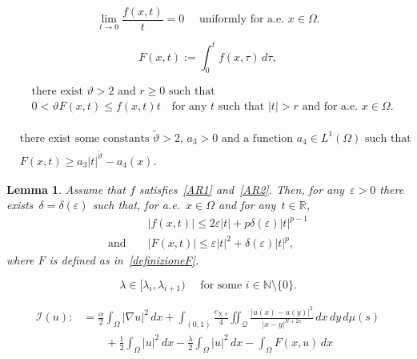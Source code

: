 \documentclass[10pt,a4paper]{amsart}
\newtheorem{lemma}{Lemma}
\def \N {\mathbb{N}}
\def \Q {\mathcal Q}
\def \R {\mathbb{R}}
\renewcommand{\geq}{\geqslant}
\renewcommand{\leq}{\leqslant}
\begin{document}
\begin{equation}\label{AR2}
\lim_{t\to 0}\frac{f(x,t)}{t}=0  \quad \mbox{ uniformly for a.e. } x\in \Omega.
\end{equation}

\begin{equation}\label{definizioneF}
F(x,t):=\int_0^t f(x,\tau)\,d\tau,
\end{equation}

\begin{equation}\label{AR3}
\begin{split}
&\mbox{there exist $\vartheta>2$ and $r\geq 0$ such that}\\
&0<\vartheta F(x,t)\leq f(x,t)t  \quad\mbox{for any } t \mbox{ such that } |t|> r \mbox{ and for a.e. } x\in \Omega.
\end{split}
\end{equation}

\begin{equation}\label{AR4}
\begin{split}
&\mbox{there exist some constants~$\widetilde{\vartheta}>2$, $a_3>0$ and a function~$a_4\in L^1(\Omega)$ such that}\\
&F(x,t)\geq a_3|t|^{\widetilde{\vartheta}}-a_4(x).
\end{split}
\end{equation}

\begin{lemma}\label{SV12}
Assume that $f$ satisfies~\eqref{AR1} and~\eqref{AR2}.
Then, for any~$\varepsilon>0$ there exists~$\delta=\delta(\varepsilon)$ such that, for a.e.~$x\in \Omega$ and for any~$t\in \R$,
\begin{eqnarray}&&
|f(x,t)|\leq 2\varepsilon|t|+p\delta(\varepsilon)|t|^{p-1}\nonumber
\\
{\mbox{and }}&&
\label{F1}
|F(x,t)|\leq \varepsilon|t|^2+\delta(\varepsilon)|t|^{p},
\end{eqnarray}
where $F$ is defined as in~\eqref{definizioneF}.
\end{lemma}

\begin{equation}\label{successivi}
\lambda\in [\lambda_i, \lambda_{i+1})\quad\mbox{ for some } i\in\N\setminus\{0\}.
\end{equation}

\begin{equation}\label{funlink}
\begin{split}
\mathcal I(u):&= \frac{\alpha}{2}\int_\Omega |\nabla u|^2 \,dx +\int_{(0, 1)} \frac{c_{N, s}}{4} \iint_{\Q} \frac{|u(x)-u(y)|^2}{|x-y|^{N+2s}} \,dx\,dy\, d\mu(s)\\
&\qquad+\frac12 \int_{\Omega} |u|^2 \, dx -\frac{\lambda}{2} \int_{\Omega} |u|^2 \, dx - \int_\Omega F(x, u) \, dx
\end{split}
\end{equation}
\end{document}
